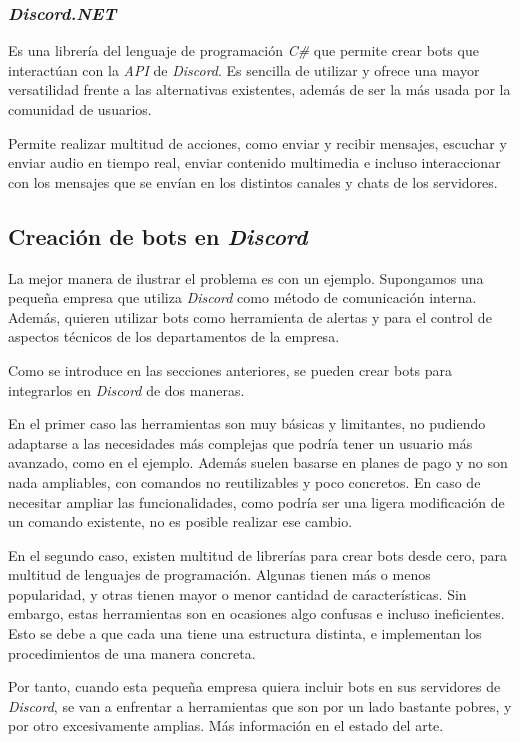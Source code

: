 \subsubsection{\textit{Discord.NET}}

Es una librería del lenguaje de programación \textit{C\#} que permite crear bots que interactúan con la \textit{API} de \textit{Discord}. Es sencilla de utilizar y ofrece una mayor versatilidad frente a las alternativas existentes, además de ser la más usada por la comunidad de usuarios.

Permite realizar multitud de acciones, como enviar y recibir mensajes, escuchar y enviar audio en tiempo real, enviar contenido multimedia e incluso interaccionar con los mensajes que se envían en los distintos canales y chats de los servidores.


\subsection{Creación de bots en \textit{Discord}}

La mejor manera de ilustrar el problema es con un ejemplo. Supongamos una pequeña empresa que utiliza \textit{Discord} como método de comunicación interna. Además, quieren utilizar bots como herramienta de alertas y para el control de aspectos técnicos de los departamentos de la empresa.

Como se introduce en las secciones anteriores, se pueden crear bots para integrarlos en \textit{Discord} de dos maneras.

En el primer caso las herramientas son muy básicas y limitantes, no pudiendo adaptarse a las necesidades más complejas que podría tener un usuario más avanzado, como en el ejemplo. Además suelen basarse en planes de pago y no son nada ampliables, con comandos no reutilizables y poco concretos. En caso de necesitar ampliar las funcionalidades, como podría ser una ligera modificación de un comando existente, no es posible realizar ese cambio.

En el segundo caso, existen multitud de librerías para crear bots desde cero, para multitud de lenguajes de programación. Algunas tienen más o menos popularidad, y otras tienen mayor o menor cantidad de características. Sin embargo, estas herramientas son en ocasiones algo confusas e incluso ineficientes. Esto se debe a que cada una tiene una estructura distinta, e implementan los procedimientos de una manera concreta.

Por tanto, cuando esta pequeña empresa quiera incluir bots en sus servidores de \textit{Discord}, se van a enfrentar a herramientas que son por un lado bastante pobres, y por otro excesivamente amplias. Más información en el estado del arte.

